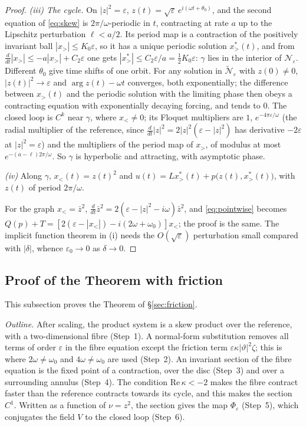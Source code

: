\documentclass[11pt,reqno]{amsart}
\theoremstyle{plain}
\theoremstyle{definition}
\theoremstyle{remark}
\begin{document}
\begin{proof}
\emph{(iii) The cycle.} On $|z|^{2}=\varepsilon$, $z(t)=\sqrt\varepsilon\,e^{i(\omega t+\theta_0)}$, and
the second equation of \eqref{eq:skew} is $2\pi/\omega$-periodic in $t$, contracting at rate $a$ up
to the Lipschitz perturbation $\ell<a/2$. Its period map is a contraction of the positively
invariant ball $|x_>|\le K_0\varepsilon$, so it has a unique periodic solution $x_>^{*}(t)$, and from
$\frac{d}{dt}|x_>|\le-a|x_>|+C_2\varepsilon$ one gets $|x_>^{*}|\le C_2\varepsilon/a=\frac12K_0\varepsilon$:
$\gamma$ lies in the interior of $\mathcal N_\varepsilon$. Different $\theta_0$ give time shifts of one orbit. For
any solution in $\tilde{\mathcal N}_\varepsilon$ with $z(0)\neq0$, $|z(t)|^{2}\to\varepsilon$ and
$\arg z(t)-\omega t$ converges, both exponentially; the difference between $x_>(t)$ and the periodic
solution with the limiting phase then obeys a contracting equation with exponentially decaying
forcing, and tends to $0$. The closed loop is $C^{k}$ near $\gamma$, where $x_<\neq0$; its Floquet
multipliers are $1$, $e^{-4\pi\varepsilon/\omega}$ (the radial multiplier of the reference, since
$\frac{d}{dt}|z|^{2}=2|z|^{2}(\varepsilon-|z|^{2})$ has derivative $-2\varepsilon$ at $|z|^{2}=\varepsilon$)
and the multipliers of the period map of $x_>$, of modulus at most $e^{-(a-\ell)2\pi/\omega}$. So
$\gamma$ is hyperbolic and attracting, with asymptotic phase.

\emph{(iv)} Along $\gamma$, $x_<(t)=z(t)^{2}$ and $u(t)=Lx_>^{*}(t)+p\bigl(z(t),x_>^{*}(t)\bigr)$, with
$z(t)$ of period $2\pi/\omega$.

For the graph $x_<=\bar z^{2}$, $\frac{d}{dt}\bar z^{2}=2(\varepsilon-|z|^{2}-i\omega)\bar z^{2}$, and
\eqref{eq:pointwise} becomes $Q(p)+T=[2(\varepsilon-|x_<|)-i(2\omega+\omega_0)]x_<$; the proof is the
same. The implicit function theorem in (i) needs the $O(\sqrt\varepsilon)$ perturbation small
compared with $|\delta|$, whence $\varepsilon_0\to0$ as $\delta\to0$.
\end{proof}

\subsection{Proof of the Theorem with friction}\label{app:friction}
This subsection proves the Theorem of \S\ref{sec:friction}.

\emph{Outline.} After scaling, the product system is a skew product over the reference, with a two-dimensional
fibre (Step~1). A normal-form substitution removes all terms of order $\varepsilon$ in the fibre equation except
the friction term $\varepsilon\kappa|\vartheta|^{2}\zeta$; this is where $2\omega\neq\omega_0$ and $4\omega\neq\omega_0$ are
used (Step~2). An invariant section of the fibre equation is the fixed point of a contraction, over the disc
(Step~3) and over a surrounding annulus (Step~4). The condition $\mathrm{Re}\,\kappa<-2$ makes the fibre contract
faster than the reference contracts towards its cycle, and this makes the section $C^{1}$. Written as a function
of $\nu=z^{2}$, the section gives the map $\Phi_\varepsilon$ (Step~5), which conjugates the field $V$ to the closed
loop (Step~6).
\end{document}
